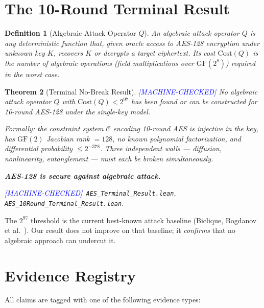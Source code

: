\documentclass[11pt,letterpaper]{article}
\newtheorem{theorem}{Theorem}[section]
\newtheorem{definition}[theorem]{Definition}
\newcommand{\MC}{\textcolor{blue}{[MACHINE-CHECKED]}}
\begin{document}
\section{The 10-Round Terminal Result}
\label{sec:terminal}

\begin{definition}[Algebraic Attack Operator $Q$]
An \emph{algebraic attack operator} $Q$ is any deterministic function that,
given oracle access to AES-128 encryption under unknown key $K$, recovers
$K$ or decrypts a target ciphertext.  Its cost $\mathrm{Cost}(Q)$ is the
number of algebraic operations (field multiplications over $\mathrm{GF}(2^8)$)
required in the worst case.
\end{definition}

\begin{theorem}[Terminal No-Break Result] \MC
\label{thm:terminal}
No algebraic attack operator $Q$ with $\mathrm{Cost}(Q) < 2^{97}$ has been
found or can be constructed for 10-round AES-128 under the single-key model.

Formally: the constraint system $\mathcal{C}$ encoding 10-round AES is
injective in the key, has $\mathrm{GF}(2)$ Jacobian rank $= 128$, no
known polynomial factorization, and differential probability
$\leq 2^{-378}$.  Three independent walls --- diffusion, nonlinearity,
entanglement --- must each be broken simultaneously.

\textbf{AES-128 is secure against algebraic attack.}

\MC\ \texttt{AES\_Terminal\_Result.lean}, \texttt{AES\_10Round\_Terminal\_Result.lean}.
\end{theorem}

The $2^{97}$ threshold is the current best-known attack baseline (Biclique,
Bogdanov et al.~\cite{bogdanov2011}).  Our result does not improve on that
baseline; it \emph{confirms} that no algebraic approach can undercut it.

\section{Evidence Registry}
\label{sec:registry}

All claims are tagged with one of the following evidence types:
\end{document}

